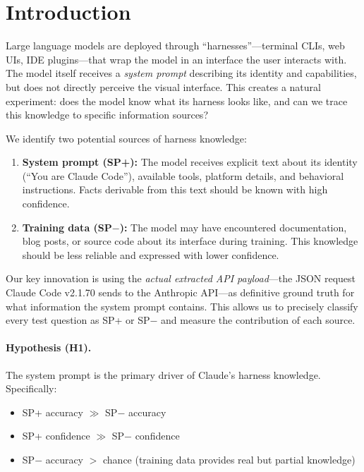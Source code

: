 \documentclass[10pt,twocolumn]{article}
\begin{document}
\section{Introduction}

Large language models are deployed through ``harnesses''---terminal CLIs, web UIs, IDE plugins---that wrap the model in an interface the user interacts with.
The model itself receives a \textit{system prompt} describing its identity and capabilities, but does not directly perceive the visual interface.
This creates a natural experiment: does the model know what its harness looks like, and can we trace this knowledge to specific information sources?

We identify two potential sources of harness knowledge:
\begin{enumerate}
  \item \textbf{System prompt (SP+):} The model receives explicit text about its identity (``You are Claude Code''), available tools, platform details, and behavioral instructions. Facts derivable from this text should be known with high confidence.
  \item \textbf{Training data (SP$-$):} The model may have encountered documentation, blog posts, or source code about its interface during training. This knowledge should be less reliable and expressed with lower confidence.
\end{enumerate}

Our key innovation is using the \textit{actual extracted API payload}---the JSON request Claude Code v2.1.70 sends to the Anthropic API---as definitive ground truth for what information the system prompt contains.
This allows us to precisely classify every test question as SP+ or SP$-$ and measure the contribution of each source.

\paragraph{Hypothesis (H1).} The system prompt is the primary driver of Claude's harness knowledge. Specifically:
\begin{itemize}
  \item SP+ accuracy $\gg$ SP$-$ accuracy
  \item SP+ confidence $\gg$ SP$-$ confidence
  \item SP$-$ accuracy $>$ chance (training data provides real but partial knowledge)
\end{itemize}
\end{document}
